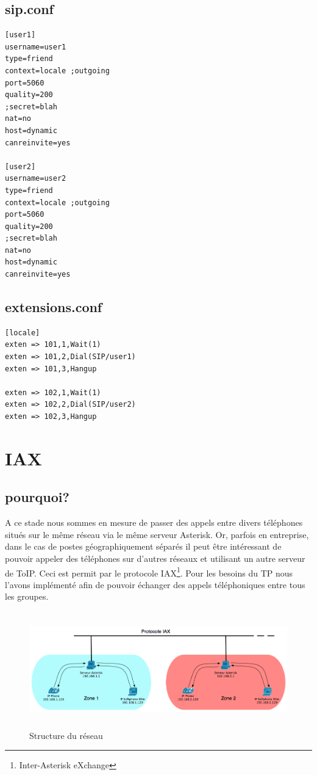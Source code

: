 \documentclass[12pt,a4paper,notitlepage]{article}
\begin{document}
\subsection{sip.conf}

\begin{lstlisting}[title=sip.conf v1]
[user1]
username=user1
type=friend
context=locale ;outgoing
port=5060
quality=200
;secret=blah
nat=no
host=dynamic
canreinvite=yes

[user2]
username=user2
type=friend
context=locale ;outgoing
port=5060
quality=200
;secret=blah
nat=no
host=dynamic
canreinvite=yes
\end{lstlisting}

\subsection{extensions.conf}

\begin{lstlisting}[title=Extensions.conf v1]
[locale]
exten => 101,1,Wait(1)
exten => 101,2,Dial(SIP/user1)
exten => 101,3,Hangup

exten => 102,1,Wait(1)
exten => 102,2,Dial(SIP/user2)
exten => 102,3,Hangup
\end{lstlisting}


\section{IAX} 
\subsection{pourquoi?}
A ce stade nous sommes en mesure de passer des appels entre divers téléphones situés sur le même réseau via le même serveur Asterisk. Or, parfois en entreprise, dans le cas de postes géographiquement séparés il peut être intéressant de pouvoir appeler des téléphones sur d'autres réseaux et utilisant un autre serveur de ToIP. Ceci est permit par le protocole IAX\footnote{Inter-Asterisk eXchange}. Pour les besoins du TP nous l'avons implémenté afin de pouvoir échanger des appels téléphoniques entre tous les groupes.

\begin{figure}[!h]
\begin{center}
\includegraphics[height=5cm]{structure_reseau_IAX}
\caption{Structure du réseau}
\label{fig:da}
\end{center}
\end{figure}
\end{document}
